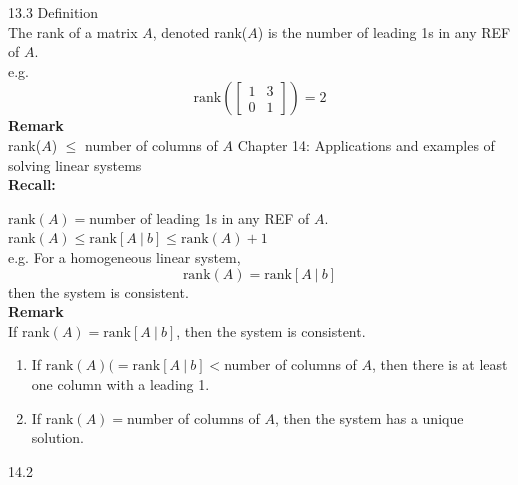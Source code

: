 \documentclass[]{article}
\begin{document}
		\large{13.3 Definition}\\
		\normalsize
		The rank of a matrix $A$, denoted rank($A$) is the number of leading 1s in any REF of $A$.\\
		e.g.
		$$
			\text{rank}\left(\begin{bmatrix}{1}&{3}\\{0}&{1}\end{bmatrix}\right)=2
		$$
		{\bf Remark}\\
		rank($A$) $\le$ number of columns of $A$
		\Large{Chapter 14: Applications and examples of
                  solving linear systems}\\
                \normalsize
                {\bf Recall:}

                $\text{rank}(A)=$number of leading 1s in any REF of
                $A$.\\
                rank$(A)\le\text{rank}[A~|~b]\le\text{rank}(A)+1$\\
                e.g. For a homogeneous linear system,
                $$
                \text{rank}(A)=\text{rank}[A~|~b]
                $$
                then the system is consistent.\\
                {\bf Remark}\\
                If rank$(A)=\text{rank}[A~|~b]$, then the system is
                consistent.
                \begin{enumerate}
                  \item If $\text{rank}(A)(=\text{rank}[A~|~b]<$number
                    of columns of $A$, then there is at least one
                    column with a leading 1.
                  \item If rank$(A)=$number of columns of $A$, then
                    the system has a unique solution. 
                \end{enumerate}
                \large{14.2}\\
                \normalsize
\end{document}
